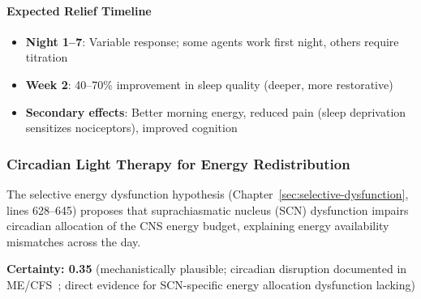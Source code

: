 \paragraph{Expected Relief Timeline}
\begin{itemize}
    \item \textbf{Night 1--7}: Variable response; some agents work first night, others require titration
    \item \textbf{Week 2}: 40--70\% improvement in sleep quality (deeper, more restorative)
    \item \textbf{Secondary effects}: Better morning energy, reduced pain (sleep deprivation sensitizes nociceptors), improved cognition
\end{itemize}

\subsubsection{Circadian Light Therapy for Energy Redistribution}
\label{subsubsec:circadian-light-therapy}

\begin{hypothesis}
The selective energy dysfunction hypothesis (Chapter~\ref{sec:selective-dysfunction}, lines 628--645) proposes that suprachiasmatic nucleus (SCN) dysfunction impairs circadian allocation of the CNS energy budget, explaining energy availability mismatches across the day.

\textbf{Certainty: 0.35} (mechanistically plausible; circadian disruption documented in ME/CFS~\cite{cambras2018circadian,castromarrero2021melatonin}; direct evidence for SCN-specific energy allocation dysfunction lacking)
\end{hypothesis}

